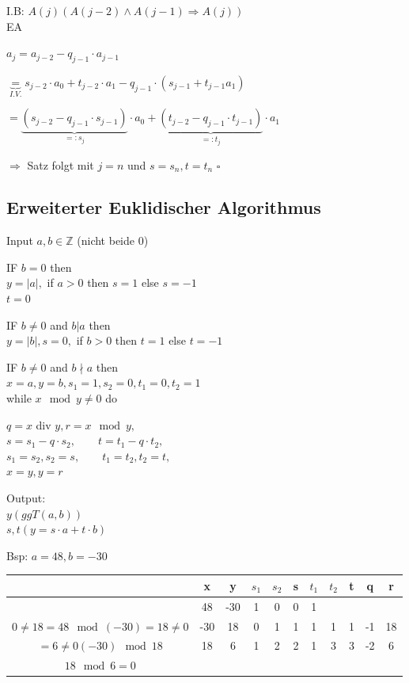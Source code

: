 \documentclass[a4paper, 12pt, twoside] {article}
\begin{document}
I.B: $A(j) (A(j-2) \wedge A(j-1) \Rightarrow A(j))$ \\
EA

$a_j = a_{j-2} - q_{j-1} \cdot a_{j-1}$

$\underbrace{=}_{I.V.} s_{j-2} \cdot a_0 + t_{j-2} \cdot a_1 - q_{j-1} \cdot (s_{j-1} + t_{j-1} a_1)$

$= \underbrace{(s_{j-2} - q_{j-1} \cdot s_{j-1})}_{=: s_j} \cdot a_0 + \underbrace{(t_{j-2} - q_{j-1} \cdot t_{j-1})}_{=: t_j} \cdot a_1$

$\Rightarrow$ Satz folgt mit $j = n$ und $s = s_n, t = t_n$ \hfill $\square$

\subsection{Erweiterter Euklidischer Algorithmus} %

Input $a, b \in \mathbb{Z}$ (nicht beide $0$)

IF $b = 0$ then \\
\qquad $y = |a|,$ if $a > 0$ then $s = 1$ else $s = -1$ \\
\qquad $t = 0$

IF $b \neq 0$ and $b|a$ then \\
\qquad $y = |b|, s = 0,$ if $ b > 0$ then $t = 1$ else $t = -1$

IF $b \neq 0$ and $b \nmid a$ then \\
\qquad $x = a, y = b, s_1 = 1, s_2 = 0, t_1 = 0, t_2 = 1$ \\
\qquad while $x \mod y \neq 0$ do

$q = x$ div $y, r = x \mod y,$ \\
$s = s_1 - q \cdot s_2, \qquad t = t_1 - q \cdot t_2,$ \\
$s_1 = s_2, s_2 = s, \qquad t_1 = t_2, t_2 = t,$ \\
$x = y, y = r$

Output: \\
$y (ggT(a, b))$ \\
$s, t (y = s \cdot a + t \cdot b)$

Bsp: $a = 48, b = -30$

\begin{tabular}{| c | c | c | c | c | c | c | c | c | c | c |}
\hline
& x & y & $s_1$ & $s_2$ & s & $t_1$ & $t_2$ & t & q & r \\
\hline
& 48 & -30 & 1 & 0 & 0 & 1 & & & & \\
$0 \neq 18 = 48 \mod (-30) = 18 \neq 0$ & -30 & 18 & 0 & 1 & 1 & 1 & 1 & 1 & -1 & 18 \\
$= 6 \neq 0 (-30) \mod 18$ & 18 & 6 & 1 & 2 & 2 & 1 & 3 & 3 & -2 & 6 \\
$18 \mod 6 = 0$ & & & & & & & & & & \\
\hline
\end{tabular}
\end{document}
